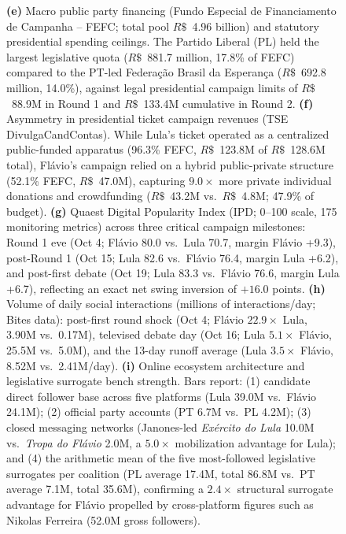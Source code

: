 \begin{figure}[t!]
{\textbf{(e)} Macro public party financing (Fundo Especial de Financiamento de Campanha -- FEFC; total pool $R\$$~4.96 billion) and statutory presidential spending ceilings. The Partido Liberal (PL) held the largest legislative quota ($R\$$~881.7 million, 17.8\% of FEFC) compared to the PT-led Federa{\c{c}}{\~a}o Brasil da Esperan{\c{c}}a ($R\$$~692.8 million, 14.0\%), against legal presidential campaign limits of $R\$$~88.9M in Round 1 and $R\$$~133.4M cumulative in Round 2.
\textbf{(f)} Asymmetry in presidential ticket campaign revenues (TSE DivulgaCandContas). While Lula's ticket operated as a centralized public-funded apparatus (96.3\% FEFC, $R\$$~123.8M of $R\$$~128.6M total), Fl{\'a}vio's campaign relied on a hybrid public-private structure (52.1\% FEFC, $R\$$~47.0M), capturing $9.0\times$ more private individual donations and crowdfunding ($R\$$~43.2M vs.\ $R\$$~4.8M; 47.9\% of budget).
\textbf{(g)} Quaest Digital Popularity Index (IPD; 0--100 scale, 175 monitoring metrics) across three critical campaign milestones: Round 1 eve (Oct 4; Fl{\'a}vio 80.0 vs.\ Lula 70.7, margin Fl{\'a}vio +9.3), post-Round 1 (Oct 15; Lula 82.6 vs.\ Fl{\'a}vio 76.4, margin Lula +6.2), and post-first debate (Oct 19; Lula 83.3 vs.\ Fl{\'a}vio 76.6, margin Lula +6.7), reflecting an exact net swing inversion of $+16.0$ points.
\textbf{(h)} Volume of daily social interactions (millions of interactions/day; Bites data): post-first round shock (Oct 4; Fl{\'a}vio $22.9\times$ Lula, 3.90M vs.\ 0.17M), televised debate day (Oct 16; Lula $5.1\times$ Fl{\'a}vio, 25.5M vs.\ 5.0M), and the 13-day runoff average (Lula $3.5\times$ Fl{\'a}vio, 8.52M vs.\ 2.41M/day).
\textbf{(i)} Online ecosystem architecture and legislative surrogate bench strength. Bars report: (1) candidate direct follower base across five platforms (Lula 39.0M vs.\ Flávio 24.1M); (2) official party accounts (PT 6.7M vs.\ PL 4.2M); (3) closed messaging networks (Janones-led \emph{Ex{\'e}rcito do Lula} 10.0M vs.\ \emph{Tropa do Fl{\'a}vio} 2.0M, a $5.0\times$ mobilization advantage for Lula); and (4) the arithmetic mean of the five most-followed legislative surrogates per coalition (PL average 17.4M, total 86.8M vs.\ PT average 7.1M, total 35.6M), confirming a $2.4\times$ structural surrogate advantage for Fl{\'a}vio propelled by cross-platform figures such as Nikolas Ferreira (52.0M gross followers).
\par}
\end{figure}


